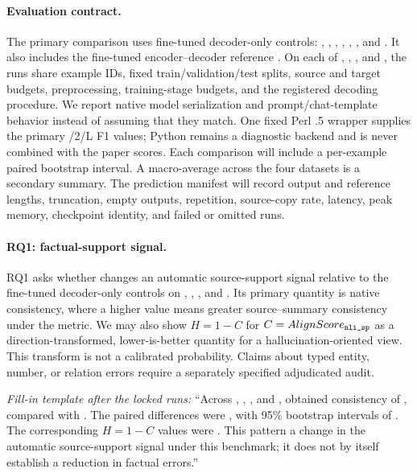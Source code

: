 \paragraph{Evaluation contract.}
The primary comparison uses fine-tuned decoder-only controls:
\QwenZeroSix, \QwenFour, \QwenEight, \LlamaThreeTwoThree,
\LlamaThreeEight, \NemotronThree, and \NemotronEight.  It also includes the
fine-tuned encoder--decoder reference \TfiveGemma.  On each of \PubMed,
\ArXiv, \BookSum, and \GovReport, the runs share example IDs, fixed
train/validation/test splits, source and target budgets, preprocessing,
training-stage budgets, and the registered decoding procedure.  We report
native model serialization and prompt/chat-template behavior instead of
assuming that they match.  One fixed Perl .5 wrapper supplies the
primary /2/L F1 values; Python \Rouge remains a diagnostic backend and
is never combined with the paper scores.  Each comparison will include a
per-example paired bootstrap interval.  A macro-average across the four
datasets is a secondary summary.  The prediction manifest will record output
and reference lengths, truncation, empty outputs, repetition, source-copy rate,
latency, peak memory, checkpoint identity, and failed or omitted runs.

\paragraph{RQ1: factual-support signal.}
RQ1 asks whether \EviSeq changes an automatic source-support signal relative to
the fine-tuned decoder-only controls on \PubMed, \ArXiv, \BookSum, and
\GovReport.  Its primary quantity is native \AlignScore consistency, where a
higher value means greater source--summary consistency under the metric.  We
may also show $H=1-C$ for $C=AlignScore_{\texttt{nli\_sp}}$ as a
direction-transformed, lower-is-better quantity for a hallucination-oriented
view.  This transform is not a calibrated probability.  Claims about typed
entity, number, or relation errors require a separately specified adjudicated
audit.

\emph{Fill-in template after the locked runs:} ``Across \PubMed, \ArXiv,
\BookSum, and \GovReport, \EviSeq obtained \AlignScore consistency of
, compared with .  The paired differences were , with 95\%
bootstrap intervals of .  The corresponding $H=1-C$ values
were .  This pattern  a change in
the automatic source-support signal under this benchmark; it does not by
itself establish a reduction in factual errors.''

